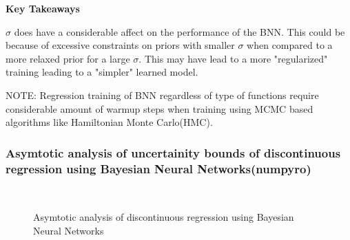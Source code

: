 \documentclass[a4paper, twocolumn]{article}
\begin{document}
\textbf{Key Takeaways}

$\sigma$ does have a considerable affect on the performance of the BNN. This could be because of excessive constraints on priors with smaller $\sigma$ when compared to a more relaxed prior for a large $\sigma$. This may have lead to a more "regularized" training leading to a "simpler" learned model.


NOTE: Regression training of BNN regardless of type of functions require considerable amount of warmup steps when training using MCMC based algorithms like Hamiltonian Monte Carlo(HMC).


\subsubsection*{Asymtotic analysis of uncertainity bounds of discontinuous regression using Bayesian Neural Networks(numpyro)}
\label{sec-5-4-3}

\begin{figure}[!h]
    \hfill
    \hfill
    \hfill
    \hfill
    \hfill
    \\
    \caption{Asymtotic analysis of discontinuous regression using Bayesian Neural Networks}
    \label{aysmtotic_discont_regression}
\end{figure}
\end{document}
